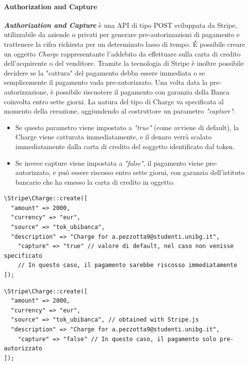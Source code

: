 \paragraph{Authorization and Capture}
\textbf{\textit{Authorization and Capture}} è una API di tipo POST sviluppata da Stripe, utilizzabile da aziende o privati per generare pre-autorizzazioni di pagamento e trattenere la cifra richiesta per un determinato lasso di tempo. \'E possibile creare un oggetto \textit{Charge} rappresentante l'addebito da effettuare sulla carta di credito dell'acquirente o del venditore. Tramite la tecnologia di Stripe è inoltre possibile decidere se la "cattura" del pagamento debba essere immediata o se semplicemente il pagamento vada pre-autorizzato. Una volta data la pre-autorizzazione, è possibile riscuotere il pagamento con garanzia della Banca coinvolta entro sette giorni. La natura del tipo di Charge va specificata al momento della creazione, aggiundendo al costruttore un parametro \textit{"capture"}: 
\begin{itemize}
\item Se questo parametro viene impostato a \textit{"true"} (come avviene di default), la Charge viene catturata immediatamente, e il denaro verrà scalato immediatamente dalla carta di credito del soggetto identificato dal token. 
\item Se invece capture viene impostata a \textit{"false"}, il pagamento viene pre-autorizzato, e può essere riscosso entro sette giorni, con garanzia dell'istituto bancario che ha emesso la carta di credito in oggetto.
\end{itemize}

\begin{lstlisting}[caption={creazione di un oggetto Charge, che verrà poi utilizzato catturare il pagamento corrispondente, con cattura immediata}]
\Stripe\Charge::create([
  "amount" => 2000,
  "currency" => "eur",
  "source" => "tok_ubibanca", 
  "description" => "Charge for a.pezzotta9@studenti.unibg.it",
	"capture" => "true" // valore di default, nel caso non venisse specificato
	// In questo caso, il pagamento sarebbe riscosso immediatamente
]);
\end{lstlisting}
\begin{lstlisting}[caption={creazione di un oggetto Charge, che verrà poi utilizzato catturare il pagamento corrispondente, con cattura entro sette giorni}]
\Stripe\Charge::create([
  "amount" => 2000,
  "currency" => "eur",
  "source" => "tok_ubibanca", // obtained with Stripe.js
  "description" => "Charge for a.pezzotta9@studenti.unibg.it",
	"capture" => "false" // In questo caso, il pagamento solo pre-autorizzato
]);
\end{lstlisting}

